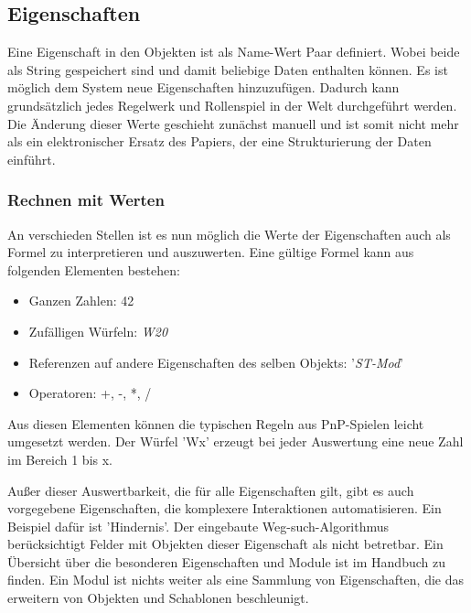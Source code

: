 \subsection{Eigenschaften}
\label{sec:Eigenschaften}
Eine Eigenschaft in den Objekten ist als Name-Wert Paar definiert. Wobei beide als String gespeichert sind und damit beliebige Daten enthalten können. Es ist möglich dem System neue Eigenschaften hinzuzufügen. Dadurch kann grundsätzlich jedes Regelwerk und Rollenspiel in der Welt durchgeführt werden. Die Änderung dieser Werte geschieht zunächst manuell und ist somit nicht mehr als ein elektronischer Ersatz des Papiers, der eine Strukturierung der Daten einführt.\newline

\subsubsection{Rechnen mit Werten}
An verschieden Stellen ist es nun möglich die Werte der Eigenschaften auch als Formel zu interpretieren und auszuwerten. Eine gültige Formel kann aus folgenden Elementen bestehen:
\begin{itemize}
	\item Ganzen Zahlen: 42
	\item Zufälligen Würfeln: \textit{W20}
	\item Referenzen auf andere Eigenschaften des selben Objekts: '\textit{ST-Mod}'
	\item Operatoren: +, -, *, /
\end{itemize}

Aus diesen Elementen können die typischen Regeln aus PnP-Spielen leicht umgesetzt werden. Der Würfel 'Wx' erzeugt bei jeder Auswertung eine neue Zahl im Bereich 1 bis x.

Außer dieser Auswertbarkeit, die für alle Eigenschaften gilt, gibt es auch vorgegebene Eigenschaften, die komplexere Interaktionen automatisieren.\newline
Ein Beispiel dafür ist 'Hindernis'. Der eingebaute Weg-such-Algorithmus berücksichtigt Felder mit Objekten dieser Eigenschaft als nicht betretbar. Ein Übersicht über die besonderen Eigenschaften und Module ist im Handbuch zu finden. Ein Modul ist nichts weiter als eine Sammlung von Eigenschaften, die das erweitern von Objekten und Schablonen beschleunigt.

